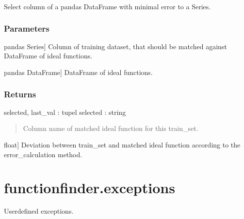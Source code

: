 \documentclass[letterpaper,10pt,english]{sphinxmanual}
\begin{document}
\begin{fulllineitems}
\label{\detokenize{_autosummary/functionfinder.datafunctions.min_error:functionfinder.datafunctions.min_error}}
\pysigstartsignatures
{}
\pysigstopsignatures
\sphinxAtStartPar
Select column of a pandas DataFrame with minimal error to a Series.


\subsubsection{Parameters}
\label{\detokenize{_autosummary/functionfinder.datafunctions.min_error:parameters}}\begin{description}
\sphinxlineitem{train\_set}{[}pandas Series{]}
\sphinxAtStartPar
Column of training dataset, that should be matched against DataFrame
of ideal functions.

\sphinxlineitem{ideal\_df}{[}pandas DataFrame{]}
\sphinxAtStartPar
DataFrame of ideal functions.

\end{description}


\subsubsection{Returns}
\label{\detokenize{_autosummary/functionfinder.datafunctions.min_error:returns}}
\sphinxAtStartPar
selected, last\_val : tupel
selected : string
\begin{quote}

\sphinxAtStartPar
Column name of matched ideal function for this train\_set.
\end{quote}
\begin{description}
\sphinxlineitem{last\_val}{[}float{]}
\sphinxAtStartPar
Deviation between train\_set and matched ideal function according to
the error\_calculation method.

\end{description}

\end{fulllineitems}


\sphinxstepscope


\section{functionfinder.exceptions}
\label{\detokenize{_autosummary/functionfinder.exceptions:module-functionfinder.exceptions}}\label{\detokenize{_autosummary/functionfinder.exceptions:functionfinder-exceptions}}\label{\detokenize{_autosummary/functionfinder.exceptions::doc}}
\sphinxAtStartPar
Userdefined exceptions.
\end{document}
